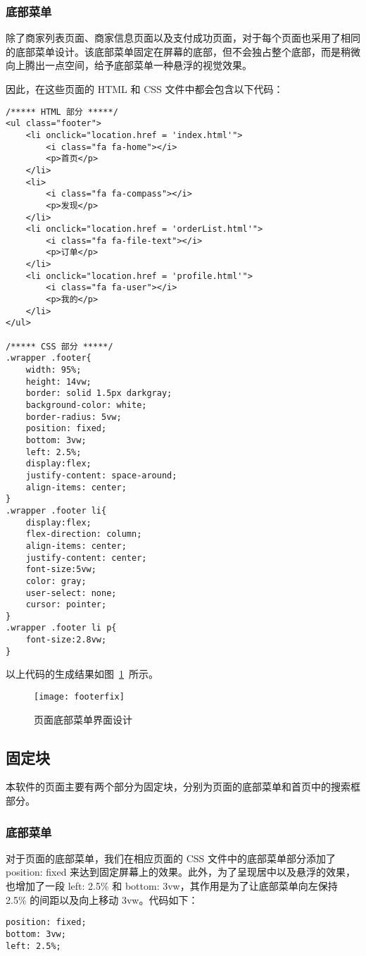 \subsubsection{底部菜单}
除了商家列表页面、商家信息页面以及支付成功页面，对于每个页面也采用了相同的底部菜单设计。该底部菜单固定在屏幕的底部，但不会独占整个底部，而是稍微向上腾出一点空间，给予底部菜单一种悬浮的视觉效果。

因此，在这些页面的 HTML 和 CSS 文件中都会包含以下代码：
\begin{lstlisting}[basicstyle=\footnotesize]
/***** HTML 部分 *****/
<ul class="footer">
    <li onclick="location.href = 'index.html'">
        <i class="fa fa-home"></i>
        <p>首页</p>
    </li>
    <li>
        <i class="fa fa-compass"></i>
        <p>发现</p>
    </li>
    <li onclick="location.href = 'orderList.html'">
        <i class="fa fa-file-text"></i>
        <p>订单</p>
    </li>
    <li onclick="location.href = 'profile.html'">
        <i class="fa fa-user"></i>
        <p>我的</p>
    </li>
</ul>

/***** CSS 部分 *****/
.wrapper .footer{
	width: 95%;
	height: 14vw;
	border: solid 1.5px darkgray;
	background-color: white;
	border-radius: 5vw;
	position: fixed;
	bottom: 3vw;
	left: 2.5%;
	display:flex;
	justify-content: space-around;
	align-items: center;
}
.wrapper .footer li{
	display:flex;
	flex-direction: column;
	align-items: center;
	justify-content: center;
	font-size:5vw;
	color: gray;
	user-select: none;
	cursor: pointer;
}
.wrapper .footer li p{
	font-size:2.8vw;
}
\end{lstlisting}
以上代码的生成结果如图~\ref{fig:footerfix}~所示。  
\begin{figure}[htbp]
    \centering
    \texttt{[image: footerfix]}
    \caption{页面底部菜单界面设计}\label{fig:footerfix}
    \vspace{\baselineskip}
\end{figure}

\subsection{固定块}
本软件的页面主要有两个部分为固定块，分别为页面的底部菜单和首页中的搜索框部分。

\subsubsection{底部菜单}
对于页面的底部菜单，我们在相应页面的 CSS 文件中的底部菜单部分添加了 position: fixed 来达到固定屏幕上的效果。此外，为了呈现居中以及悬浮的效果，也增加了一段 left: 2.5\% 和 bottom: 3vw，其作用是为了让底部菜单向左保持 2.5\% 的间距以及向上移动 3vw。代码如下：
\begin{lstlisting}[basicstyle=\footnotesize]
position: fixed;
bottom: 3vw;
left: 2.5%;
\end{lstlisting}

